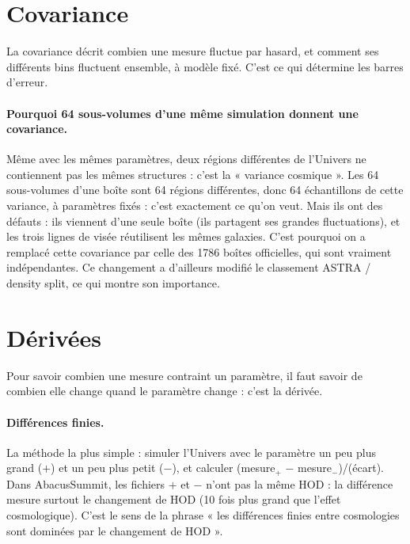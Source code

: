 \documentclass[11pt]{article}
\begin{document}
\section{Covariance}

La covariance décrit combien une mesure fluctue par hasard, et comment ses différents bins fluctuent ensemble, à modèle fixé. C'est ce qui détermine les barres d'erreur.

\paragraph{Pourquoi 64 sous-volumes d'une même simulation donnent une covariance.} Même avec les mêmes paramètres, deux régions différentes de l'Univers ne contiennent pas les mêmes structures : c'est la « variance cosmique ». Les 64 sous-volumes d'une boîte sont 64 régions différentes, donc 64 échantillons de cette variance, à paramètres fixés : c'est exactement ce qu'on veut. Mais ils ont des défauts : ils viennent d'une seule boîte (ils partagent ses grandes fluctuations), et les trois lignes de visée réutilisent les mêmes galaxies. C'est pourquoi on a remplacé cette covariance par celle des 1786 boîtes officielles, qui sont vraiment indépendantes. Ce changement a d'ailleurs modifié le classement ASTRA / density split, ce qui montre son importance.

\section{Dérivées}

Pour savoir combien une mesure contraint un paramètre, il faut savoir de combien elle change quand le paramètre change : c'est la dérivée.

\paragraph{Différences finies.} La méthode la plus simple : simuler l'Univers avec le paramètre un peu plus grand ($+$) et un peu plus petit ($-$), et calculer (mesure$_+$ $-$ mesure$_-$)/(écart). Dans AbacusSummit, les fichiers $+$ et $-$ n'ont pas la même HOD : la différence mesure surtout le changement de HOD (10 fois plus grand que l'effet cosmologique). C'est le sens de la phrase « les différences finies entre cosmologies sont dominées par le changement de HOD ».
\end{document}

